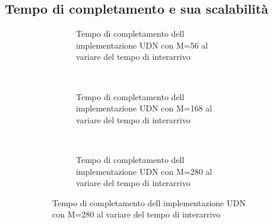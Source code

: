 \documentclass[a4paper]{article}
\begin{document}
\subsection{Tempo di completamento e sua scalabilit\`a}

\begin{figure}[!h]
  \caption{Grafici del tempo di completamento al variare del tempo di interarrivo}
  \begin{subfigure}[b]{.5\columnwidth}
    \centering
    \renewcommand\thesubfigure{\alph{subfigure}}
    \caption{Implementazione con solo UDN}
    \begin{subfigure}[b]{\textwidth}
      \centering
      \addtocounter{subfigure}{-1}
      \renewcommand\thesubfigure{\alph{subfigure}1}
      \resizebox{\columnwidth}{!}{}
      \caption{Tempo di completamento dell implementazione UDN con M=56 al variare del tempo di interarrivo}
      \label{fig:scalability_UDN_size56}
    \end{subfigure}
    ~
    \begin{subfigure}[b]{\textwidth}
      \centering
      \addtocounter{subfigure}{-1}
      \renewcommand\thesubfigure{\alph{subfigure}2}
      \resizebox{\columnwidth}{!}{}
      \caption{Tempo di completamento dell implementazione UDN con M=168 al variare del tempo di interarrivo}
      \label{fig:scalability_UDN_size168}
    \end{subfigure}
    ~
    \begin{subfigure}[b]{\textwidth}
      \centering
      \addtocounter{subfigure}{-1}
      \renewcommand\thesubfigure{\alph{subfigure}3}
      \resizebox{\columnwidth}{!}{}
      \caption{Tempo di completamento dell implementazione UDN con M=280 al variare del tempo di interarrivo}
      \label{fig:scalability_UDN_size280}
    \end{subfigure}
    \label{fig:allScalbility_UDN}
  \end{subfigure}
  \hspace{2ex}
  \begin{subfigure}[b]{.5\columnwidth}
    \centering
    \renewcommand\thesubfigure{\alph{subfigure}}
    \caption{Implementazione con solo SM}
    \begin{subfigure}[b]{\textwidth}
      \centering
      \addtocounter{subfigure}{-1}
      \renewcommand\thesubfigure{\alph{subfigure}1}

\end{subfigure}
\end{subfigure}
\end{figure}
\end{document}
